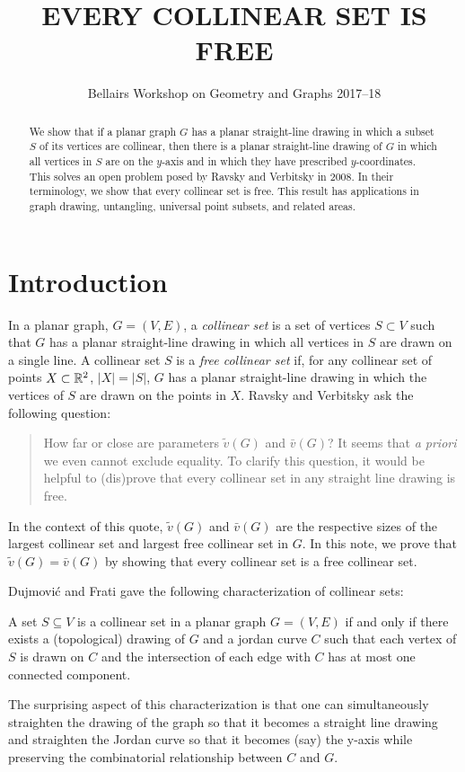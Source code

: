 \documentclass{patmorin}
\title{\MakeUppercase{Every Collinear Set is Free}}
\author{Bellairs Workshop on Geometry and Graphs 2017--18}
\begin{document}
\maketitle


\begin{abstract}
  We show that if a planar graph $G$ has a planar straight-line drawing
  in which a subset $S$ of its vertices are collinear, then there is a
  planar straight-line drawing of $G$ in which all vertices in $S$ are
  on the $y$-axis and in which they have prescribed $y$-coordinates.
  This solves an open problem posed by Ravsky and Verbitsky in 2008.
  In their terminology, we show that every collinear set is free.
  This result has applications in graph drawing, untangling, universal
  point subsets, and related areas.
\end{abstract}


\section{Introduction}

In a planar graph, $G=(V,E)$, a \emph{collinear set} is a set of vertices
$S\subset V$ such that $G$ has a planar straight-line drawing in which
all vertices in $S$ are drawn on a single line.  A collinear set $S$
is a \emph{free collinear set} if, for any collinear set of points
$X\subset\mathbb{R}^2$, $|X|=|S|$, $G$ has a planar straight-line drawing in
which the vertices of $S$ are drawn on the points in $X$.  Ravsky and
Verbitsky \cite{ravsky.verbitsky:on} ask the following question:

\begin{quote}
   How far or close are parameters $\tilde{v}(G)$ and $\bar{v}(G)$? It
   seems that \emph{a priori} we even cannot exclude equality. To clarify
   this question, it would be helpful to (dis)prove that every collinear
   set in any straight line drawing is free.
\end{quote}

In the context of this quote, $\tilde{v}(G)$ and $\bar{v}(G)$ are the
respective sizes of the largest collinear set and largest free collinear
set in $G$.  In this note, we prove that $\tilde{v}(G)=\bar{v}(G)$ by
showing that every collinear set is a free collinear set.  

Dujmovi\'c and Frati gave the following characterization of collinear sets:
\begin{thm}
   A set $S\subseteq V$ is a collinear set in a planar graph $G=(V,E)$
   if and only if there exists a (topological) drawing of $G$ and a
   jordan curve $C$ such that each vertex of $S$ is drawn on $C$ and the
   intersection of each edge with $C$ has at most one connected component.
\end{thm}
The surprising aspect of this characterization is that one can
simultaneously straighten the drawing of the graph so that it becomes a
straight line drawing and straighten the Jordan curve so that it becomes
(say) the y-axis while preserving the combinatorial relationship between
$C$ and $G$.
\end{document}
